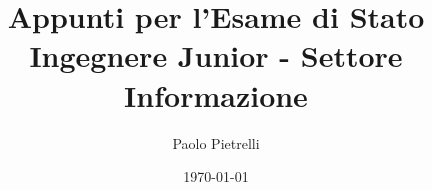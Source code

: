 \documentclass[a4paper,12pt,openright,twoside]{book} %
\title{Appunti per l'Esame di Stato\\Ingegnere Junior - Settore Informazione}
\author{Paolo Pietrelli}
\date{\today} %
\begin{document}
\sloppy %

\frontmatter %

\maketitle %


\tableofcontents %
\listoffigures %
\lstlistoflistings %

\mainmatter %











\backmatter %

\printbibliography %
\end{document}
